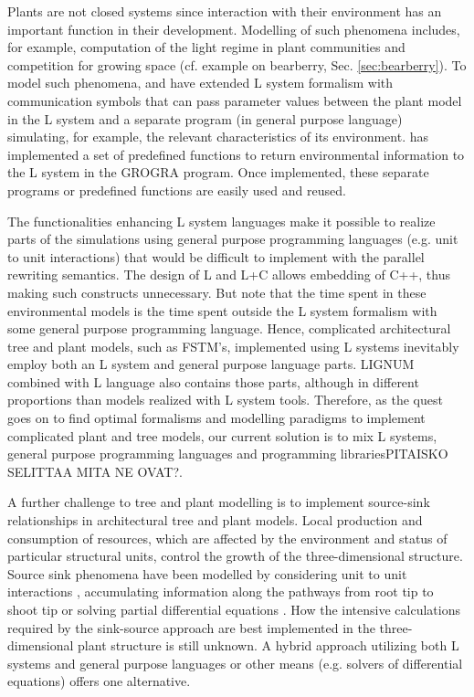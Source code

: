 Plants are not closed systems since interaction with their environment
has  an important function  in their  development.  Modelling  of such
phenomena includes,  for example, computation  of the light  regime in
plant communities  and competition for growing space  (cf.  example on
bearberry,  Sec.   \ref{sec:bearberry}).   To  model  such  phenomena,
\citet{mech:97} and  \citet{mech:96} have extended  L system formalism
with communication symbols that  can pass parameter values between the
plant model in the L system and a separate program (in general purpose
language) simulating, for example, the relevant characteristics of its
environment.   \citet{kurth:94} has  implemented a  set  of predefined
functions to return  environmental information to the L  system in the
GROGRA  program.    Once  implemented,  these   separate  programs  or
predefined functions are easily used and reused.

The  functionalities enhancing L system  languages make it possible to
realize parts  of the  simulations using  general  purpose programming
languages (e.g.  unit to unit interactions) that would be difficult to
implement with the parallel rewriting semantics.   The design of L and
L+C allows embedding of C++,  thus making such constructs unnecessary. 
But note that the time spent in these environmental models is the time
spent outside the   L system   formalism  with  some  general  purpose
programming language.  Hence, complicated architectural tree and plant
models, such as FSTM's, implemented using  L systems inevitably employ
both an L system and general purpose  language parts.  LIGNUM combined
with  L   language also contains  those   parts, although in different
proportions than  models realized with L  system tools.  Therefore, as
the quest goes on  to find optimal  formalisms and modelling paradigms
to implement complicated plant and  tree models, our current  solution
is to  mix   L systems,  general  purpose programming   languages  and
programming librariesPITAISKO SELITTAA MITA NE OVAT?.
 
A  further challenge  to  tree  and plant  modelling  is to  implement
source-sink  relationships  in architectural  tree  and plant  models.
Local production  and consumption of resources, which  are affected by
the environment and status of particular structural units, control the
growth of the three-dimensional structure.  Source sink phenomena have
been   modelled    by   considering   unit    to   unit   interactions
\citep{balandier:00}, accumulating information along the pathways from
root  tip   to  shoot  tip  \citep{dereffye:97}   or  solving  partial
differential  equations  \citep{deleuze:97,  palovaara:03}.   How  the
intensive calculations  required by the sink-source  approach are best
implemented in the three-dimensional plant structure is still unknown.
A  hybrid  approach  utilizing  both  L systems  and  general  purpose
languages  or other  means (e.g.   solvers of  differential equations)
offers one alternative.

